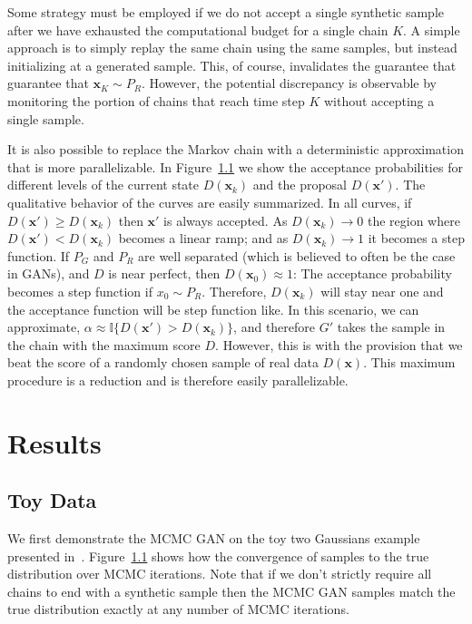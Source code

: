 \documentclass{article}
\renewcommand{\vec}[1]{{\boldsymbol{\mathbf{#1}}}} %
\newcommand{\I}{\mathbb{I}}
\newcommand{\sample}{\sim}
\begin{document}
Some strategy must be employed if we do not accept a single synthetic sample after we have exhausted the computational budget for a single chain $K$.
A simple approach is to simply replay the same chain using the same samples, but instead initializing at a generated sample.
This, of course, invalidates the guarantee that guarantee that $\vec x_K \sample P_R$.
However, the potential discrepancy is observable by monitoring the portion of chains that reach time step $K$ without accepting a single sample.


It is also possible to replace the Markov chain with a deterministic approximation that is more parallelizable.
In Figure~\ref{} we show the acceptance probabilities for different levels of the current state $D(\vec x_k)$ and the proposal $D(\vec x')$.
The qualitative behavior of the curves are easily summarized.
In all curves, if $D(\vec x') \geq D(\vec x_k)$ then $\vec x'$ is always accepted.
As $D(\vec x_k) \rightarrow 0$ the region where $D(\vec x') < D(\vec x_k)$ becomes a linear ramp; and as $D(\vec x_k) \rightarrow 1$ it becomes a step function.
If $P_G$ and $P_R$ are well separated (which is believed to often be the case in GANs), and $D$ is near perfect, then $D(\vec x_0) \approx 1$: The acceptance probability becomes a step function if $x_0 \sample P_R$.
Therefore, $D(\vec x_k)$ will stay near one and the acceptance function will be step function like.
In this scenario, we can approximate, $\alpha \approx \I\{D(\vec x') > D(\vec x_k)\}$, and therefore $G'$ takes the sample in the chain with the maximum score $D$.
However, this is with the provision that we beat the score of a randomly chosen sample of real data $D(\vec x)$.
This maximum procedure is a reduction and is therefore easily parallelizable.


\section{Results}


\subsection{Toy Data}
We first demonstrate the MCMC GAN on the toy two Gaussians example presented in~\citet{}.
Figure~\ref{} shows how the convergence of samples to the true distribution over MCMC iterations.
Note that if we don't strictly require all chains to end with a synthetic sample then the MCMC GAN samples match the true distribution exactly at any number of MCMC iterations.
\end{document}

